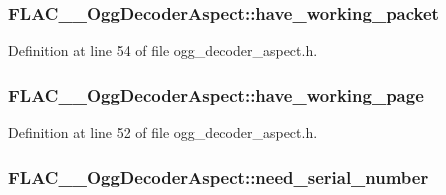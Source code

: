 \subsubsection[{\texorpdfstring{have\+\_\+working\+\_\+packet}{have_working_packet}}]{ F\+L\+A\+C\+\_\+\+\_\+\+Ogg\+Decoder\+Aspect\+::have\+\_\+working\+\_\+packet}\hypertarget{struct_f_l_a_c_____ogg_decoder_aspect_a81e82436142f6a79c584520d11b2fe9f}{}\label{struct_f_l_a_c_____ogg_decoder_aspect_a81e82436142f6a79c584520d11b2fe9f}


Definition at line 54 of file ogg\+\_\+decoder\+\_\+aspect.\+h.

\subsubsection[{\texorpdfstring{have\+\_\+working\+\_\+page}{have_working_page}}]{ F\+L\+A\+C\+\_\+\+\_\+\+Ogg\+Decoder\+Aspect\+::have\+\_\+working\+\_\+page}\hypertarget{struct_f_l_a_c_____ogg_decoder_aspect_a189d26c093d2f4d55e1a00106d8c28ae}{}\label{struct_f_l_a_c_____ogg_decoder_aspect_a189d26c093d2f4d55e1a00106d8c28ae}


Definition at line 52 of file ogg\+\_\+decoder\+\_\+aspect.\+h.

\subsubsection[{\texorpdfstring{need\+\_\+serial\+\_\+number}{need_serial_number}}]{ F\+L\+A\+C\+\_\+\+\_\+\+Ogg\+Decoder\+Aspect\+::need\+\_\+serial\+\_\+number}\hypertarget{struct_f_l_a_c_____ogg_decoder_aspect_a16b14ef02b6674a7052f686bbca6999b}{}\label{struct_f_l_a_c_____ogg_decoder_aspect_a16b14ef02b6674a7052f686bbca6999b}


